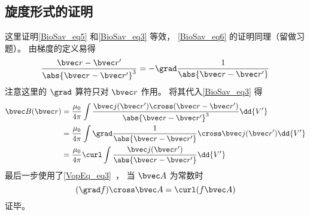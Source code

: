 \subsection{旋度形式的证明}
这里证明\autoref{BioSav_eq5} 和\autoref{BioSav_eq3} 等效， \autoref{BioSav_eq6} 的证明同理（留做习题）。 由梯度的定义易得
\begin{equation}
\frac{\bvec r - \bvec r'}{\abs{\bvec r - \bvec r'}^3} = -\grad \frac{1}{\abs{\bvec r - \bvec r'}}
\end{equation}
注意这里的 $\grad$ 算符只对 $\bvec r $ 作用。 将其代入\autoref{BioSav_eq3} 得
\begin{equation}
\begin{aligned}
\bvec B(\bvec r) &= \frac{\mu_0}{4\pi} \int \frac{\bvec j(\bvec r') \cross (\bvec r - \bvec r')}{\abs{\bvec r - \bvec r'}^3} \dd{V'}\\
&= \frac{\mu_0}{4\pi} \int \grad \frac{1}{\abs{\bvec r - \bvec r'}} \cross \bvec j(\bvec r') \dd{V'}\\
&= \frac{\mu_0}{4\pi} \curl \int \frac{\bvec j(\bvec r')}{\abs{\bvec r - \bvec r'}} \dd{V'}
\end{aligned}
\end{equation}
最后一步使用了\autoref{VopEq_eq3}~， 当 $\bvec A$ 为常数时
\begin{equation}
(\grad f) \cross\bvec A = \curl(f\bvec A)
\end{equation}
证毕。
